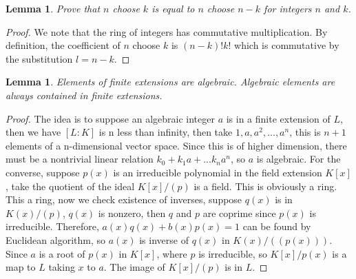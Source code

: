 \documentclass[10pt,twocolumn]{article}
\newtheorem{lemma}[theorem]{Lemma}
\begin{document}
\begin{lemma}
Prove that $n$ choose $k$ is equal to $n$ choose $n - k$ for integers $n$ and $k$.
\end{lemma}

\begin{proof}
    We note that the ring of integers has commutative multiplication. By definition, the coefficient of $n$ choose $k$ is $(n - k)! k!$ which is commutative by the substitution $l = n - k$.
\end{proof}


\begin{lemma}
    Elements of finite extensions are algebraic. Algebraic elements are always contained in finite extensions.
\end{lemma}

\begin{proof}
The idea is to suppose an algebraic integer $a$ is in a finite extension of $L$, then we have $[L:K]$ is n less than infinity, then take $1, a, a^2, ..., a^n$, this is $n + 1$ elements of a n-dimensional vector space. Since this is of higher dimension, there must be a nontrivial linear relation $k_0 + k_1 a + ... k_n a^n$, so $a$ is algebraic. For the converse, suppose $p(x)$ is an irreducible polynomial in the field extension $K[x]$, take the quotient of the ideal $K[x]/(p)$ is a field. This is obviously a ring. This a ring, now we check existence of inverses, suppose $q(x)$ is in $K(x)/(p)$, $q(x)$ is nonzero, then $q$ and $p$ are coprime since $p(x)$ is irreducible. Therefore, $a(x)q(x) + b(x) p(x) = 1$ can be found by Euclidean algorithm, so $a(x)$ is inverse of $q(x)$ in $K(x)/((p(x)))$. Since $a$ is a root of $p(x)$ in $K[x]$, where $p$ is irreducible, so $K[x]/p(x)$ is a map to $L$ taking $x$ to $a$. The image of $K[x]/(p)$ is in $L$.
\end{proof}


\end{document}

